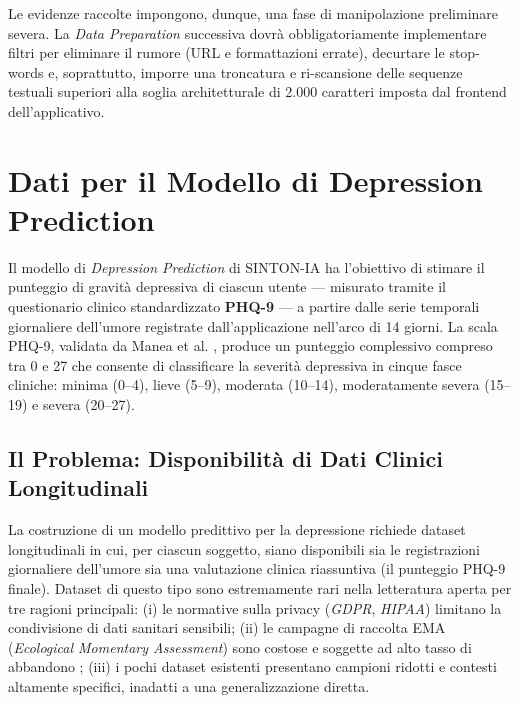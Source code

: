 Le evidenze raccolte impongono, dunque, una fase di manipolazione preliminare severa. La \textit{Data Preparation} successiva dovrà obbligatoriamente implementare filtri per eliminare il rumore (URL e formattazioni errate), decurtare le stop-words e, soprattutto, imporre una troncatura e ri-scansione delle sequenze testuali superiori alla soglia architetturale di 2.000 caratteri imposta dal frontend dell'applicativo.


\section{Dati per il Modello di Depression Prediction}
\label{sec:data_depression}

Il modello di \textit{Depression Prediction} di SINTON-IA ha l'obiettivo di stimare il punteggio di gravità depressiva di ciascun utente --- misurato tramite il questionario clinico standardizzato \textbf{PHQ-9} \cite{kroenke2001phq9} --- a partire dalle serie temporali giornaliere dell'umore registrate dall'applicazione nell'arco di 14 giorni. La scala PHQ-9, validata da Manea et al. \cite{manea2012phq9}, produce un punteggio complessivo compreso tra 0 e 27 che consente di classificare la severità depressiva in cinque fasce cliniche: minima (0--4), lieve (5--9), moderata (10--14), moderatamente severa (15--19) e severa (20--27).

\subsection{Il Problema: Disponibilità di Dati Clinici Longitudinali}
\label{subsec:problema_dati_depression}

La costruzione di un modello predittivo per la depressione richiede dataset longitudinali in cui, per ciascun soggetto, siano disponibili sia le registrazioni giornaliere dell'umore sia una valutazione clinica riassuntiva (il punteggio PHQ-9 finale). Dataset di questo tipo sono estremamente rari nella letteratura aperta per tre ragioni principali: (i) le normative sulla privacy (\textit{GDPR}, \textit{HIPAA}) limitano la condivisione di dati sanitari sensibili; (ii) le campagne di raccolta EMA (\textit{Ecological Momentary Assessment}) sono costose e soggette ad alto tasso di abbandono \cite{aanhetrot2012ema}; (iii) i pochi dataset esistenti presentano campioni ridotti e contesti altamente specifici, inadatti a una generalizzazione diretta.

